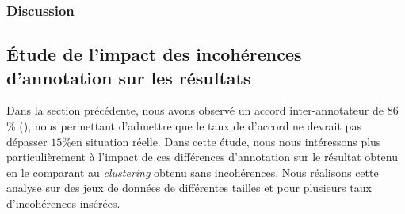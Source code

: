 		\subsubsection{Discussion}
		
		
			
			
	
	
	\subsection{Étude de l'impact des incohérences d'annotation sur les résultats}
	\label{section:4.6.3-ETUDE-ROBUSTESSE-SIMULATION-IMPACT-DIFFERENCES}
		
		Dans la section précédente, nous avons observé un accord inter-annotateur de $86$\% (), nous permettant d'admettre que le taux de d'accord ne devrait pas dépasser $15$\%en situation réelle.
		Dans cette étude, nous nous intéressons plus particulièrement à l'impact de ces différences d'annotation sur le résultat obtenu en le comparant au \textit{clustering} obtenu sans incohérences.
		Nous réalisons cette analyse sur des jeux de données de différentes tailles et pour plusieurs taux d'incohérences insérées.
		
